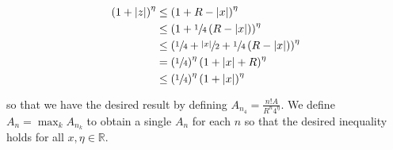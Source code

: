 \begin{solution}
    \begin{align*}
    \left(1 + |z| \right)^{\eta} &\le \left(1 + R - |x| \right)^{\eta} \\
                                 &\le \left(1 + \sfrac{1}{4}\left(R - |x|\right) \right)^{\eta} \\
                                 &\le \left(\sfrac{1}{4} + \sfrac{|x|}{2} + \sfrac{1}{4}\left(R - |x|\right) \right)^{\eta} \\
                                 &= \left(\sfrac{1}{4}\right)^{\eta} \left(1 + |x| + R \right)^{\eta} \\
                                 &\le \left(\sfrac{1}{4}\right)^{\eta} \left(1 + |x| \right)^{\eta} \\
    \end{align*}

    so that we have the desired result by defining $A_{n_4} = \frac{n! A}{R^n 4^{\eta}}$. We define 
    $A_n = \max_k{A_{n_k}}$ to obtain a single $A_n$ for each $n$ so that the desired inequality holds for all 
    $x, \eta \in \mathbb{R}$.


\end{solution}
